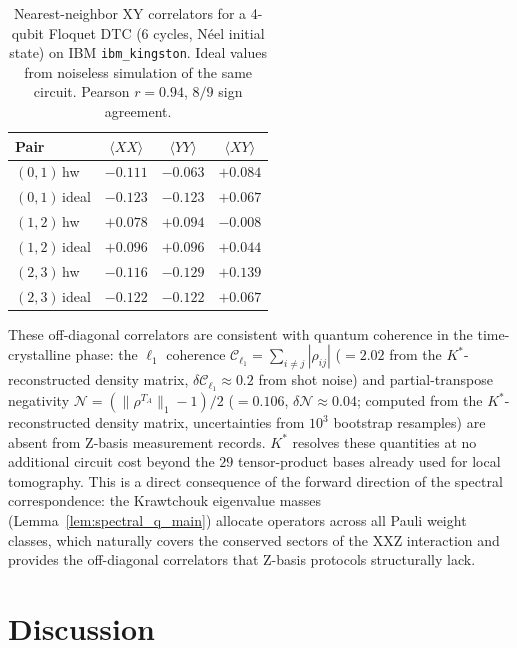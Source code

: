 \documentclass[twocolumn,prx,aps,superscriptaddress,longbibliography,floatfix]{revtex4-2}
\begin{document}
\begin{table}[tb]
\centering
\caption{Nearest-neighbor XY correlators for a 4-qubit
Floquet DTC ($6$ cycles, N\'eel initial state) on IBM
\texttt{ibm\_kingston}.  Ideal values from noiseless
simulation of the same circuit.  Pearson $r = 0.94$,
$8/9$ sign agreement.}
\label{tab:dtc}
\begin{tabular}{lccc}
\hline\hline
\textrm{Pair} & $\langle XX\rangle$ & $\langle YY\rangle$
& $\langle XY\rangle$ \\
\hline
$(0,1)$\,hw   & $-0.111$ & $-0.063$ & $+0.084$ \\
$(0,1)$\,ideal & $-0.123$ & $-0.123$ & $+0.067$ \\[3pt]
$(1,2)$\,hw   & $+0.078$ & $+0.094$ & $-0.008$ \\
$(1,2)$\,ideal & $+0.096$ & $+0.096$ & $+0.044$ \\[3pt]
$(2,3)$\,hw   & $-0.116$ & $-0.129$ & $+0.139$ \\
$(2,3)$\,ideal & $-0.122$ & $-0.122$ & $+0.067$ \\
\hline\hline
\end{tabular}
\end{table}

These off-diagonal correlators are consistent with quantum
coherence in the time-crystalline phase: the $\ell_1$ coherence
$\mathcal{C}_{\ell_1} = \sum_{i \neq j}|\rho_{ij}|$
($= 2.02$ from the $K^*$-reconstructed
density matrix, $\delta\mathcal{C}_{\ell_1} \approx 0.2$ from
shot noise) and partial-transpose negativity
$\mathcal{N} = (\|\rho^{T_A}\|_1 - 1)/2$
($= 0.106$, $\delta\mathcal{N} \approx 0.04$;
computed from the $K^*$-reconstructed density matrix,
uncertainties from $10^3$ bootstrap resamples)
are absent from Z-basis measurement records.
$K^*$ resolves these quantities at no
additional circuit cost beyond the $29$ tensor-product bases
already used for local tomography.
This is a direct consequence of the forward direction of the
spectral correspondence: the Krawtchouk eigenvalue masses
(Lemma~\ref{lem:spectral_q_main}) allocate operators across
all Pauli weight classes, which naturally covers the conserved
sectors of the XXZ interaction and provides the off-diagonal
correlators that Z-basis protocols structurally lack.

\section{Discussion}
\label{sec:discussion}
\end{document}

